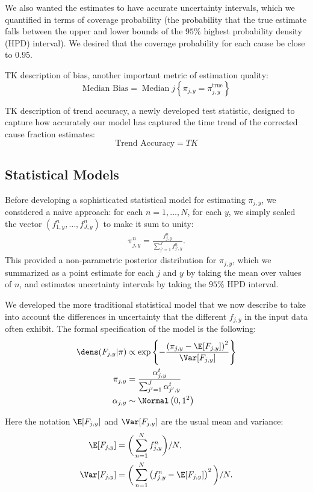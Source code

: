   We also wanted the estimates to have accurate uncertainty intervals,
  which we quantified in terms of coverage probability (the
  probability that the true estimate falls between the upper and lower
  bounds of the $95\%$ highest probability density (HPD) interval).  We desired that the
  coverage probability for each cause be close to $0.95$.

  TK description of bias, another important metric of estimation quality:
  \[
  \text{Median Bias} = \operatorname{Median}{j} \left\{ \pi_{j,y} = \pi^{\text{true}}_{j,y} \right\}
  \]

  TK description of trend accuracy, a newly developed test statistic,
  designed to capture how accurately our model has captured the time
  trend of the corrected cause fraction estimates:
  \[
  \text{Trend Accuracy} = TK
  \]

  \subsection*{Statistical Models}
  Before developing a sophisticated statistical model for estimating
  $\pi_{j,y}$, we considered a naive approach: for each
  $n=1,\ldots,N$, for each $y$, we simply scaled the vector
  $(f_{1,y}^n, \ldots, f_{J,y}^n)$ to make it sum to unity:
  \begin{align*}
    \pi_{j,y}^n = \frac{f_{j,y}^n}{\sum_{j'=1}^J f_{j',y}^n}.
  \end{align*}
  This provided a non-parametric posterior distribution for
  $\pi_{j,y}$, which we summarized as a point estimate for each $j$
  and $y$ by taking the mean over values of $n$, and estimates
  uncertainty intervals by taking the $95\%$ HPD interval.

  We developed the more traditional statistical model that we now
  describe to take into account the differences in uncertainty that
  the different $f_{j,y}$ in the input data often exhibit.  The formal
  specification of the model is the following:
  \begin{align*}
    \dens(F_{j,y} | \pi) &\propto \exp\left\{-\frac{\left(\pi_{j,y}-\E[F_{j,y}]\right)^2}{\Var[F_{j,y}]} \right\}\\
    \pi_{j,y} &= \frac{\alpha_{j,y}^t}{\sum_{j'=1}^J \alpha_{j',y}^t}\\
    \alpha_{j,y} &\sim \Normal\left(0, 1^2\right)
  \end{align*}

  Here the notation $\E[F_{j,y}]$ and $\Var[F_{j,y}]$ are the usual mean and variance:
  \begin{align*}
    \E[F_{j,y}] &= \bigg(\sum_{n=1}^N f_{j,y}^n\bigg) / N,\\
    \Var[F_{j,y}] &= \bigg(\sum_{n=1}^N \left(f_{j,y}^n - \E[F_{j,y}]\right)^2\bigg) / N.\\
  \end{align*}

